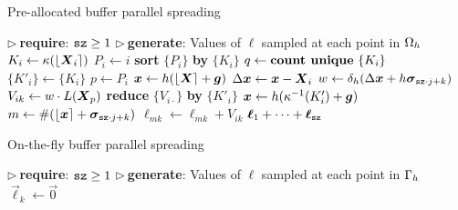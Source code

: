 \begin{algorithm}
\caption{Pre-allocated buffer parallel spreading}
\label{algo:pa-spread}
\begin{algorithmic}[1]
\State $\triangleright\ $\textbf{require}: $\texttt{sz} \ge 1$
\State $\triangleright\ $\textbf{generate}: Values of $\ell$ sampled at each point in $\Omega_h$
    \Statex {}
    \State $K_i \gets \kappa(\left\lfloor{\boldsymbol{X}_i}\right\rceil)$ 
    \State $P_i \gets i$ 
\EndFor
\State \textbf{sort} $\{P_i\}$ \textbf{by} $\{K_i\}$ 
\State $q \gets \text{\textbf{count unique} }\{K_i\}$
 
    \State $\{K'_i\} \gets \{K_i\}$
        \Statex {}
        \State $p \gets P_i$
        \State $\boldsymbol{x} \gets h(\left\lfloor{\boldsymbol{X}}\right\rceil+\boldsymbol{g})$
        \State $\Delta\boldsymbol{x} \gets \boldsymbol{x}-\boldsymbol{X}_i$
            \State $w \gets \delta_h(\Delta\boldsymbol{x}+h\boldsymbol{\sigma}_{\texttt{sz}\cdot j + k})$
            \State $V_{ik} \gets w \cdot L(\boldsymbol{X}_p)$ 
        \EndFor
    \EndFor
    \State \textbf{reduce} $\{V_{i\cdot}\}$ \textbf{by} $\{K'_i\}$
        \Statex {}
        \State $\boldsymbol{x} \gets h(\kappa^{-1}(K'_i) + \boldsymbol{g})$
            \State $m \gets \#(\left\lfloor{\boldsymbol{x}}\right\rceil + \boldsymbol{\sigma}_{\texttt{sz}\cdot j + k})$
                \State $\ell_{mk} \gets \ell_{mk} + V_{ik}$
            \EndIf
        \EndFor
    \EndFor
\EndFor
\State \Return $\boldsymbol{\ell}_1 + \cdots + \boldsymbol{\ell}_{\texttt{sz}}$
\EndProcedure
\end{algorithmic}
\end{algorithm}

\begin{algorithm}
\caption{On-the-fly buffer parallel spreading}
\label{algo:otf-spread}
\begin{algorithmic}[1]
\State $\triangleright\ $\textbf{require}: $\texttt{sz} \ge 1$
\State $\triangleright\ $\textbf{generate}: Values of $\ell$ sampled at each point in $\Gamma_h$
    \State $\vec{\ell}_k \gets \vec{0}$
\EndFor
\State \Return {}
\Statex {}
\EndProcedure {}
\end{algorithmic}
\end{algorithm}

